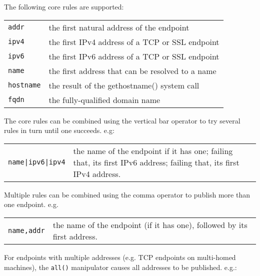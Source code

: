 \documentclass[11pt,oneside,a4paper]{book}
\newcommand{\code}[1]{\texttt{#1}}
\begin{document}
The following core rules are supported:

\vspace{\baselineskip}

\begin{tabular}{p{}p{}}
\code{addr} &     the first natural address of the endpoint\\
\code{ipv4} &     the first IPv4 address of a TCP or SSL endpoint\\
\code{ipv6} &     the first IPv6 address of a TCP or SSL endpoint\\
\code{name} &     the first address that can be resolved to a name\\
\code{hostname} & the result of the gethostname() system call\\
\code{fqdn} &     the fully-qualified domain name\\
\end{tabular}

\vspace{\baselineskip}

\noindent
The core rules can be combined using the vertical bar operator to
try several rules in turn until one succeeds. e.g:

\vspace{\baselineskip}

\begin{tabular}{p{}p{}}
\code{name|ipv6|ipv4} & the name of the endpoint if it has one;
                 	failing that, its first IPv6 address;
                 	failing that, its first IPv4 address.
\end{tabular}

\vspace{\baselineskip}

\noindent
Multiple rules can be combined using the comma operator to
publish more than one endpoint. e.g.

\vspace{\baselineskip}

\begin{tabular}{p{}p{}}
\code{name,addr} & the name of the endpoint (if it has one),
                   followed by its first address.
\end{tabular}

\vspace{\baselineskip}

\noindent
For endpoints with multiple addresses (e.g. TCP endpoints on
multi-homed machines), the \code{all()} manipulator causes all
addresses to be published. e.g.:
\end{document}
